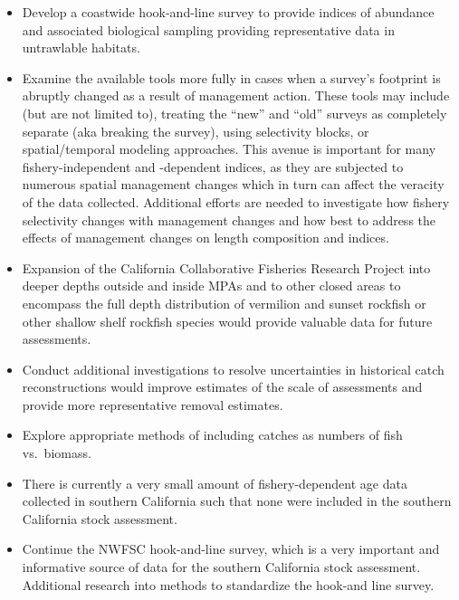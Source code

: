 \documentclass[11pt,
  english,
]{article}
\begin{document}
\begin{itemize}
\item
  Develop a coastwide hook-and-line survey to provide indices of abundance and associated biological sampling providing representative data in untrawlable habitats.
\item
  Examine the available tools more fully in cases when a survey's footprint is abruptly changed as a result of management action. These tools may include (but are not limited to), treating the ``new'' and ``old'' surveys as completely separate (aka breaking the survey), using selectivity blocks, or spatial/temporal modeling approaches. This avenue is important for many fishery-independent and -dependent indices, as they are subjected to numerous spatial management changes which in turn can affect the veracity of the data collected. Additional efforts are needed to investigate how fishery selectivity changes with management changes and how best to address the effects of management changes on length composition and indices.
\item
  Expansion of the California Collaborative Fisheries Research Project into deeper depths outside and inside MPAs and to other closed areas to encompass the full depth distribution of vermilion and sunset rockfish or other shallow shelf rockfish species would provide valuable data for future assessments.
\item
  Conduct additional investigations to resolve uncertainties in historical catch reconstructions would improve estimates of the scale of assessments and provide more representative removal estimates.
\item
  Explore appropriate methods of including catches as numbers of fish vs.~biomass.
\item
  There is currently a very small amount of fishery-dependent age data collected in southern California such that none were included in the southern California stock assessment.
\item
  Continue the NWFSC hook-and-line survey, which is a very important and informative source of data for the southern California stock assessment. Additional research into methods to standardize the hook-and line survey.
\end{itemize}

\tagstructend

\pagebreak
\setlength{\parskip}{5mm plus1mm minus1mm}
\setcounter{page}{1}
\renewcommand{\thefigure}{\arabic{figure}}
\renewcommand{\thetable}{\arabic{table}}
\setcounter{table}{0}
\setcounter{figure}{0}
\end{document}
